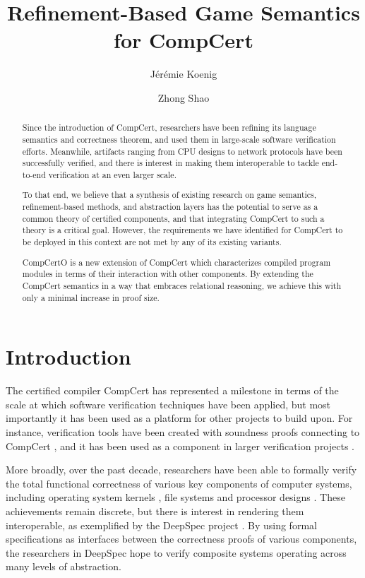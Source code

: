 \documentclass[sigplan,10pt,review,anonymous]{acmart}\settopmatter{printfolios=true,printccs=false,printacmref=false}
\title{Refinement-Based Game Semantics for CompCert}
\author{J\'er\'emie Koenig}
\affiliation{Yale University}
\author{Zhong Shao}
\affiliation{Yale University}
\begin{document}
\begin{abstract} %
Since the introduction of CompCert,
researchers have been refining
its language semantics and correctness theorem,
and used them in
large-scale software verification efforts.
Meanwhile,
artifacts ranging from CPU designs to network protocols
have been successfully verified,
and there is interest in
making them interoperable
to tackle end-to-end verification
at an even larger scale.

To that end,
we believe that
a synthesis of existing research on
game semantics,
refinement-based methods, and
abstraction layers
has the potential to serve as a common theory
of certified components,
and that integrating CompCert to such a theory
is a critical goal.
However,
the requirements we have identified for
CompCert to be deployed in this context
are not met by any of its existing variants.

CompCertO is
a new extension of CompCert
which characterizes compiled program modules
in terms of their interaction with other components.
By extending the CompCert semantics
in a way that embraces relational reasoning,
we achieve this with only a minimal increase
in proof size.
\end{abstract}

\maketitle

\section{Introduction} %


The certified compiler CompCert \cite{compcert}
has represented a milestone
in terms of the scale at which software verification techniques
have been applied,
but most importantly
it has been used as a platform for other projects to build upon.
For instance,
verification tools have been created with soundness proofs
connecting to CompCert \cite{vst,verasco},
and it has been used as a component
in larger verification projects \cite{popl15}.

More broadly, over the past decade,
researchers have been able to formally verify the
total functional correctness
of various key components of computer systems,
including
operating system kernels \cite{sel4, popl15},
file systems \cite{fscq} and
processor designs \cite{safe}.
These achievements remain discrete, but
there is interest in rendering them interoperable,
as exemplified by the DeepSpec project \cite{deepspec}.
By using formal specifications as interfaces
between the correctness proofs of various components, %
the researchers in DeepSpec hope to
verify composite systems
operating across many levels of abstraction.
\end{document}
